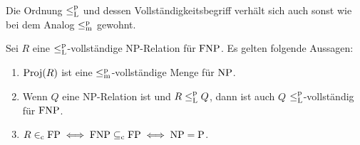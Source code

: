 Die Ordnung $\leq_\mathrm{L}^\mathrm{p}$ und dessen Vollständigkeitsbegriff verhält sich auch sonst wie bei dem Analog $\leq_\mathrm{m}^\mathrm{p}$ gewohnt.
\begin{lemma}\label{lemma:fnp-completeness}
    Sei $R$ eine $\leq_\mathrm{L}^\mathrm{p}$-vollständige NP-Relation für $\mathrm{FNP}$. Es gelten folgende Aussagen:
    \begin{enumerate}
        \item $\operatorname{Proj}(R)$ ist eine $\leq_\mathrm{m}^\mathrm{p}$-vollständige Menge für $\mathrm{NP}$.
        \item Wenn $Q$ eine NP-Relation ist und $R\leq_\mathrm{L}^\mathrm{p} Q$, dann ist auch $Q$ $\leq_\mathrm{L}^\mathrm{p}$-vollständig für $\mathrm{FNP}$.
        \item $R\in_\mathrm{c} \mathrm{FP} \iff \mathrm{FNP} \subseteq_\mathrm{c} \mathrm{FP} \iff \mathrm{NP}=\mathrm{P}$.
    \end{enumerate}
\end{lemma}

